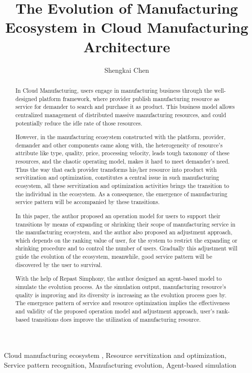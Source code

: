
\title{The Evolution of Manufacturing Ecosystem in Cloud Manufacturing Architecture
}

\author[label1]{Shengkai Chen}
\address[label1]{Zhejiang University, Institute of manufacturing engineering and automation, Hangzhou City, Zhejiang Province, China}



\begin{abstract}
In Cloud Manufacturing, users engage in manufacturing business through the well-designed platform framework, where provider publish manufacturing resource as service for demander to search and purchase it as product. This business model allows centralized management of distributed massive manufacturing resources, and could potentially reduce the idle rate of those resources.

However, in the manufacturing ecosystem constructed with the platform, provider, demander and other components came along with, the heterogeneity of resource's attribute like type, quality, price, processing velocity, leads tough taxonomy of these resources, and the chaotic operating model, makes it hard to meet demander's need.
Thus the way that each provider transforms his/her resource into product with servitization and optimization, constitutes a central issue in such manufacturing ecosystem, all these servitization and optimization activities brings the transition to the individual in the ecosystem. As a consequence, the emergence of manufacturing service pattern will be accompanied by these transitions.

In this paper, the author proposed an operation model for users to support their transitions by means of expanding or shrinking their scope of manufacturing service in the manufacturing ecosystem, and the author also proposed an adjustment approach, which depends on the ranking value of user, for the system to restrict the expanding or shrinking procedure and to control the number of users. Gradually this adjustment will guide the evolution of the ecosystem, meanwhile, good service pattern will be discovered by the user to survival. 

With the help of Repast Simphony, the author designed an agent-based model to simulate the evolution process.
As the simulation output, manufacturing resource's quality is improving and its diversity is increasing as the evolution process goes by. The emergence pattern of service and resource optimization implies the effectiveness and validity of the proposed operation model and adjustment approach, user's rank-based transitions does improve the utilization of manufacturing resource.

\end{abstract}

\begin{keyword}
Cloud manufacturing ecosystem \sep
Resource servitization and optimization\sep
Service pattern recognition\sep
Manufacturing evolution\sep
Agent-based simulation

\end{keyword}
